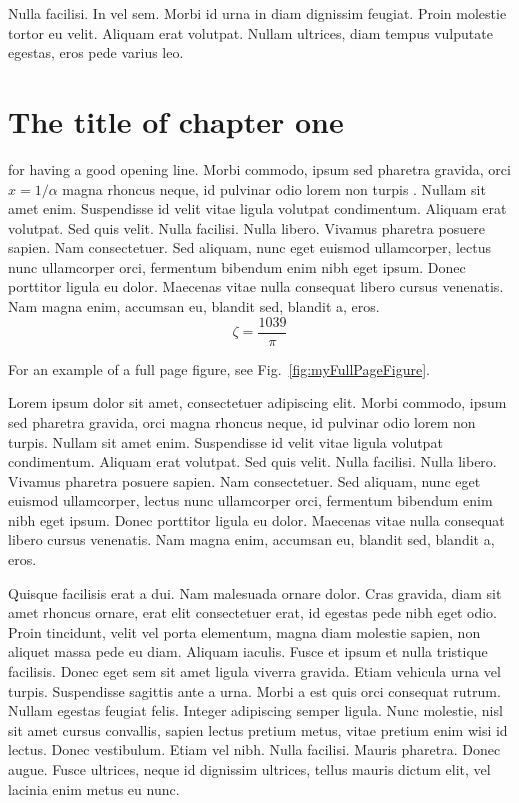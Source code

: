 \begin{savequote}[75mm] Nulla facilisi. In vel sem. Morbi id urna in diam
	dignissim feugiat. Proin molestie tortor eu velit. Aliquam erat
	volutpat. Nullam ultrices, diam tempus vulputate egestas, eros pede
	varius leo.   \end{savequote}

\chapter{The title of chapter one}

 for having a good opening line. Morbi
commodo, ipsum sed pharetra gravida, orci  $x = 1/\alpha$ magna rhoncus neque,
id pulvinar odio lorem non turpis \cite{Eigen1971, Knuth1968}. Nullam sit amet
enim. Suspendisse id velit vitae ligula volutpat condimentum. Aliquam erat
volutpat. Sed quis velit. Nulla facilisi. Nulla libero. Vivamus pharetra
posuere sapien. Nam consectetuer. Sed aliquam, nunc eget euismod ullamcorper,
lectus nunc ullamcorper orci, fermentum bibendum enim nibh eget ipsum. Donec
porttitor ligula eu dolor. Maecenas vitae nulla consequat libero cursus
venenatis. Nam magna enim, accumsan eu, blandit sed, blandit a, eros.  $$\zeta
= \frac{1039}{\pi}$$


 For an example of a full page figure, see Fig.~\ref{fig:myFullPageFigure}.

Lorem ipsum dolor sit amet, consectetuer adipiscing elit. Morbi commodo, ipsum
sed pharetra gravida, orci magna rhoncus neque, id pulvinar odio lorem non
turpis. Nullam sit amet enim. Suspendisse id velit vitae ligula volutpat
condimentum. Aliquam erat volutpat. Sed quis velit. Nulla facilisi. Nulla
libero. Vivamus pharetra posuere sapien. Nam consectetuer. Sed aliquam, nunc
eget euismod ullamcorper, lectus nunc ullamcorper orci, fermentum bibendum enim
nibh eget ipsum. Donec porttitor ligula eu dolor. Maecenas vitae nulla
consequat libero cursus venenatis. Nam magna enim, accumsan eu, blandit sed,
blandit a, eros.

Quisque facilisis erat a dui. Nam malesuada ornare dolor. Cras gravida, diam
sit amet rhoncus ornare, erat elit consectetuer erat, id egestas pede nibh eget
odio. Proin tincidunt, velit vel porta elementum, magna diam molestie sapien,
non aliquet massa pede eu diam. Aliquam iaculis. Fusce et ipsum et nulla
tristique facilisis. Donec eget sem sit amet ligula viverra gravida. Etiam
vehicula urna vel turpis. Suspendisse sagittis ante a urna. Morbi a est quis
orci consequat rutrum. Nullam egestas feugiat felis. Integer adipiscing semper
ligula. Nunc molestie, nisl sit amet cursus convallis, sapien lectus pretium
metus, vitae pretium enim wisi id lectus. Donec vestibulum. Etiam vel nibh.
Nulla facilisi. Mauris pharetra. Donec augue. Fusce ultrices, neque id
dignissim ultrices, tellus mauris dictum elit, vel lacinia enim metus eu nunc.

